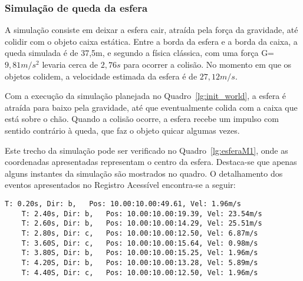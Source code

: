 \documentclass[12pt]{article}
\begin{document}
\subsubsection{Simulação de queda da esfera}

A simulação consiste em deixar a esfera cair, atraída pela força da gravidade, até colidir com o objeto caixa estática. Entre a borda da esfera e a borda da caixa, a queda simulada é de 37,5m, e segundo a física clássica, com uma força G=$9,81 m/s^{2}$ levaria cerca de $2,76s$ para ocorrer a colisão. No momento em que os objetos colidem, a velocidade estimada da esfera é de $27,12m/s$.

Com a execução da simulação planejada no Quadro~\ref{lg:init_world}, a esfera é atraída para baixo pela gravidade, até que eventualmente colida com a caixa que está sobre o chão. Quando a colisão ocorre, a esfera recebe um impulso com sentido contrário à queda, que faz o objeto quicar algumas vezes. 

Este trecho da simulação pode ser verificado no Quadro~\ref{lg:esferaM1}, onde as coordenadas apresentadas representam o centro da esfera. Destaca-se que apenas alguns instantes da simulação são mostrados no quadro. O detalhamento dos eventos apresentados no Registro Acessível encontra-se a seguir:

\begin{lstlisting}[frame=single,caption=Registro Acessível: Queda da esfera. \label{lg:esferaM1}]
	T: 0.20s, Dir: b, 	Pos: 10.00:10.00:49.61, Vel: 1.96m/s	
	T: 2.40s, Dir: b, 	Pos: 10.00:10.00:19.39, Vel: 23.54m/s
	T: 2.60s, Dir: b, 	Pos: 10.00:10.00:14.29, Vel: 25.51m/s
	T: 2.80s, Dir: c, 	Pos: 10.00:10.00:12.50, Vel: 6.87m/s
	T: 3.60S, Dir: c, 	Pos: 10.00:10.00:15.64, Vel: 0.98m/s
	T: 3.80S, Dir: b, 	Pos: 10.00:10.00:15.25, Vel: 1.96m/s
	T: 4.20S, Dir: b, 	Pos: 10.00:10.00:13.28, Vel: 5.89m/s
	T: 4.40S, Dir: c, 	Pos: 10.00:10.00:12.50, Vel: 1.96m/s
\end{lstlisting}
\end{document}
